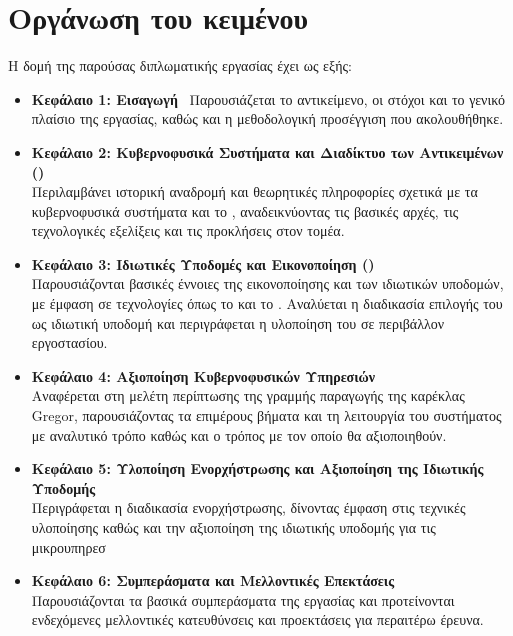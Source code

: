 \section{Οργάνωση του κειμένου}
Η δομή της παρούσας διπλωματικής εργασίας έχει ως εξής:

\begin{itemize}
\item \textbf{Κεφάλαιο 1: Εισαγωγή} \
Παρουσιάζεται το αντικείμενο, οι στόχοι και το γενικό πλαίσιο της εργασίας, καθώς και η μεθοδολογική προσέγγιση που ακολουθήθηκε.
\item \textbf{Κεφάλαιο 2: Κυβερνοφυσικά Συστήματα και Διαδίκτυο των Αντικειμένων ()} \\
Περιλαμβάνει ιστορική αναδρομή και θεωρητικές πληροφορίες σχετικά με τα κυβερνοφυσικά συστήματα και το \en{IoT}, αναδεικνύοντας τις βασικές αρχές, τις τεχνολογικές εξελίξεις και τις προκλήσεις στον τομέα.

\item \textbf{Κεφάλαιο 3: Ιδιωτικές Υποδομές και Εικονοποίηση ()} \\
Παρουσιάζονται βασικές έννοιες της εικονοποίησης και των ιδιωτικών υποδομών, με έμφαση σε τεχνολογίες όπως το  και το . Αναλύεται η διαδικασία επιλογής του  ως ιδιωτική υποδομή και περιγράφεται η υλοποίηση του σε περιβάλλον εργοστασίου.

\item \textbf{Κεφάλαιο 4: Αξιοποίηση Κυβερνοφυσικών Υπηρεσιών} \\
Αναφέρεται στη μελέτη περίπτωσης της γραμμής παραγωγής της καρέκλας Gregor, παρουσιάζοντας τα επιμέρους βήματα και τη λειτουργία του συστήματος με αναλυτικό τρόπο καθώς και ο τρόπος με τον οποίο θα αξιοποιηθούν.

\item \textbf{Κεφάλαιο 5: Υλοποίηση Ενορχήστρωσης και Αξιοποίηση της Ιδιωτικής Υποδομής} \\
Περιγράφεται η διαδικασία ενορχήστρωσης, δίνοντας έμφαση στις τεχνικές υλοποίησης καθώς και την αξιοποίηση της ιδιωτικής υποδομής για τις μικρουπηρεσ

\item \textbf{Κεφάλαιο 6: Συμπεράσματα και Μελλοντικές Επεκτάσεις} \\
Παρουσιάζονται τα βασικά συμπεράσματα της εργασίας και προτείνονται ενδεχόμενες μελλοντικές κατευθύνσεις και προεκτάσεις για περαιτέρω έρευνα.

\end{itemize}
